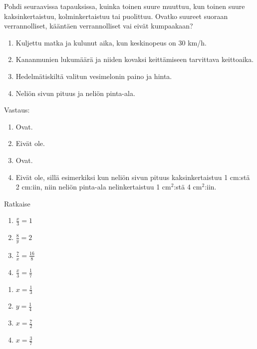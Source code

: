 \begin{tehtava}
    Pohdi seuraavissa tapauksissa, kuinka toinen suure muuttuu, kun toinen suure
    kaksinkertaistuu, kolminkertaistuu tai puolittuu. Ovatko suureet
    suoraan verrannolliset, kääntäen verrannolliset vai eivät kumpaakaan?
    
    \begin{enumerate}
        \item Kuljettu matka ja kulunut aika, kun keskinopeus on 30 km/h.
        \item Kananmunien lukumäärä ja niiden kovaksi keittämiseen tarvittava keittoaika.
        \item Hedelmätiskiltä valitun vesimelonin paino ja hinta.
        \item Neliön sivun pituus ja neliön pinta-ala.
    \end{enumerate}
    
    \begin{vastaus}
        Vastaus:
        \begin{enumerate}
            \item Ovat.
            \item Eivät ole.
            \item Ovat.
            \item Eivät ole, sillä esimerkiksi kun neliön sivun pituus
                kaksinkertaistuu 1 cm:stä 2 cm:iin, niin neliön pinta-ala
                nelinkertaistuu 1 cm$^2$:stä 4 cm$^2$:iin.
        \end{enumerate}
    \end{vastaus}
\end{tehtava}

\begin{tehtava}
Ratkaise
\begin{enumerate}
\item $ \frac{x}{3} = 1$
\item $ \frac{8}{y} = 2$
\item $ \frac{7}{x} = \frac{16}{8}$
\item $ \frac{x}{3} = \frac{1}{7}$
\end{enumerate}
\begin{vastaus}
\begin{enumerate}
\item $x= \frac{1}{3}$
\item $y= \frac{1}{4}$
\item $x= \frac{7}{2}$
\item $x= \frac{3}{7}$
\end{enumerate}
\end{vastaus}
\end{tehtava}

